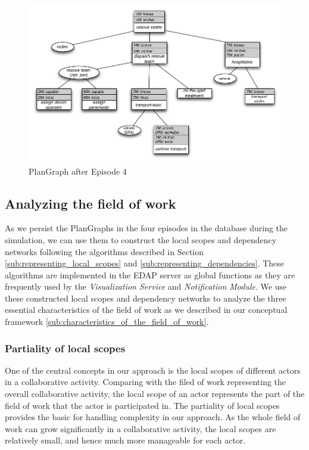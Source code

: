 \begin{figure}[htbp] %
	\centering
	\includegraphics{plangraph_ep4.pdf} 
	\caption{PlanGraph after Episode 4}
	\label{fig:plangraph_ep4}
\end{figure}

\subsection{Analyzing the field of work} %
\label{sub:analyzing_the_field_of_work}
As we persist the PlanGraphs in the four episodes in the database during the simulation, we can use them to construct the local scopes and dependency networks following the algorithms described in Section \ref{sub:representing_local_scopes} and \ref{sub:representing_dependencies}. These algorithms are implemented in the EDAP server as global functions as they are frequently used by the \emph{Visualization Service} and \emph{Notification Module}. We use these constructed local scopes and dependency networks to analyze the three essential characteristics of the field of work as we described in our conceptual framework \ref{sub:characteristics_of_the_field_of_work}.  

\subsubsection{Partiality of local scopes} %
\label{ssub:partiality_of_local_scopes}
One of the central concepts in our approach is the local scopes of different actors in a collaborative activity. Comparing with the filed of work representing the overall collaborative activity, the local scope of an actor represents the part of the field of work that the actor is participated in. The partiality of local scopes provides the basic for handling complexity in our approach. As the whole field of work can grow significantly in a collaborative activity, the local scopes are relatively small, and hence much more manageable for each actor.

